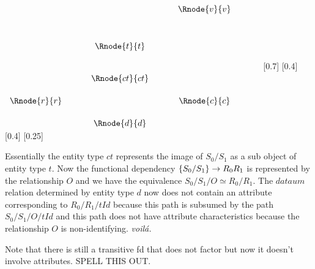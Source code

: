 $
\begin{array}{cp{0.5cm}cp{0.5cm}cp{0.3cm}c}
            &&                && \Rnode{v}{v} &&              \\[1.1cm]
            && \Rnode{t}{t}   &&              &&              \\[0.9cm] 
						&& \Rnode{ct}{ct} &&              &&              \\[0.5cm] 
\Rnode{r}{r}&&                && \Rnode{c}{c} &&              \\[0.5cm]
	          && \Rnode{d}{d}   &&              &&               
\end{array}
$
[0.7]
[0.4]
\idcomp
{}
[0.4]
\idcomp
{} 
\idcomp
{} 
\idcomp
{}
\idcomp
{}
\idcomp
{}
\idcomp
[0.25]
\idcomp

Essentially the entity type $ct$ represents the image of $S_0/S_1$
as a sub object of entity type $t$. Now the functional dependency
$\left\{S_0/S_1\right\} \rightarrow R_0{R_1}$ is represented by the relationship $O$
and we have the equivalence $S_0/S_1/O \simeq R_0/R_1$. The $dataum$
relation determined by entity type $d$ now does not contain an attribute
corresponding to $R_0/R_1/tId$ because this path is subsumed by the path
$S_0/S_1/O/tId$ and this path does not have attribute characteristics
because the relationship $O$ is non-identifying. \textit{voil\'a.}

Note that there is still a transitive fd that does not factor but now it doesn't involve attributes. SPELL THIS OUT.


